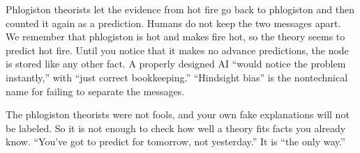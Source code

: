 Phlogiston theorists let the evidence from hot fire go back to phlogiston and then counted it again as a prediction. Humans do not keep the two messages apart. We remember that phlogiston is hot and makes fire hot, so the theory seems to predict hot fire. Until you notice that it makes no advance predictions, the node is stored like any other fact. A properly designed AI ``would notice the problem instantly,'' with ``just correct bookkeeping.''  ``Hindsight bias'' is the nontechnical name for failing to separate the messages.

The phlogiston theorists were not fools, and your own fake explanations will not be labeled. So it is not enough to check how well a theory fits facts you already know. ``You've got to predict for tomorrow, not yesterday.'' It is ``the only way.'' 
